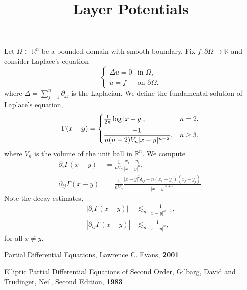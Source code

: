 \documentclass{article}
\title{Layer Potentials}
\newcommand{\R}{\mathbb{R}}
\begin{document}
\maketitle

Let $\Omega \subset \R^n$ be a bounded domain with smooth boundary.
Fix $f : \partial \Omega \to \R$ and consider Laplace's equation
\begin{equation}
\label{eq-laplace}
\begin{cases}
\Delta u = 0 & \text{in } \Omega, \\
u = f & \text{on } \partial \Omega.
\end{cases}
\end{equation}
where $\Delta = \sum_{j=1}^n \partial_{jj}$ is the Laplacian.
We define the fundamental solution of Laplace's equation,
\begin{equation}
\label{eq-fund_soln_laplace}
\Gamma(x-y)
= \begin{cases}
\frac{1}{2 \pi} \log|x-y|, & n = 2,  \vspace{2mm} \\
\displaystyle \frac{-1}{n(n-2)V_{n} |x-y|^{n-2}}, & n \ge 3,
\end{cases}
\end{equation}
where $V_n$ is the volume of the unit ball in $\R^n$.
We compute      %
\begin{align*}
\partial_i \Gamma(x-y) & = \frac{1}{n V_n} \frac{x_i - y_i}{|x-y|^n}, \\
\partial_{ij} \Gamma(x-y) & = \frac{1}{n V_n} \frac{|x-y|^2 \delta_{ij} - n (x_i - y_i)(x_j - y_j)}{|x-y|^{n+2}}.
\end{align*}
Note the decay estimates,
\begin{align*}
|\partial_i \Gamma(x-y)| & \lesssim_n \frac{1}{|x-y|^{n-1}}, \\
|\partial_{ij} \Gamma(x-y)| & \lesssim_n \frac{1}{|x-y|^{n}},
\end{align*}
for all $x \ne y$.

\begin{thebibliography}{99}
Partial Differential Equations,
Lawrence C. Evans,
\textbf{2001}

Elliptic Partial Differential Equations of Second Order,
Gilbarg, David and Trudinger, Neil,
Second Edition,
\textbf{1983}

\end{thebibliography}
\end{document}
